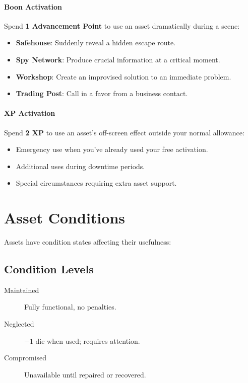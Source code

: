 \begin{multicols}{2}
\paragraph{Boon Activation}
Spend \textbf{1 Advancement Point} to use an asset dramatically during a scene:
\begin{itemize}
\item \textbf{Safehouse}: Suddenly reveal a hidden escape route.
\item \textbf{Spy Network}: Produce crucial information at a critical moment.
\item \textbf{Workshop}: Create an improvised solution to an immediate problem.
\item \textbf{Trading Post}: Call in a favor from a business contact.
\end{itemize}

\paragraph{XP Activation}
Spend \textbf{2 XP} to use an asset's off-screen effect outside your normal allowance:
\begin{itemize}
\item Emergency use when you've already used your free activation.
\item Additional uses during downtime periods.
\item Special circumstances requiring extra asset support.
\end{itemize}

\section{Asset Conditions}

Assets have condition states affecting their usefulness:

\subsection*{Condition Levels}
\begin{description}
\item[Maintained] Fully functional, no penalties.
\item[Neglected] $-1$ die when used; requires attention.
\item[Compromised] Unavailable until repaired or recovered.
\end{description}


\end{multicols}
